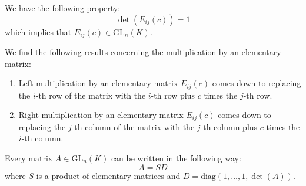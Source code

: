         \begin{property}
        	We have the following property:
		\begin{equation}
			\det(E_{ij}(c)) = 1
		\end{equation}
		which implies that $E_{ij}(c)\in\text{GL}_n(K)$.
	\end{property}
        \begin{property}
		We find the following results concerning the multiplication by an elementary matrix:
	        \begin{enumerate}
			\item Left multiplication by an elementary matrix $E_{ij}(c)$ comes down to replacing the $i$-th row of the matrix with the $i$-th row plus $c$ times the $j$-th row.
                	\item Right multiplication by an elementary matrix $E_{ij}(c)$ comes down to replacing the $j$-th column of the matrix with the $j$-th column plus $c$ times the $i$-th column.
		\end{enumerate}
		\end{property}
        
        \begin{theorem}\label{linalgebra:theorem:elementary_matrices}
		Every matrix $A\in\text{GL}_n(K)$ can be written in the following way: \[A = SD\] where $S$ is a product of elementary matrices and $D=\text{diag}(1,\dotso,1,\det(A))$.
	\end{theorem}
        
